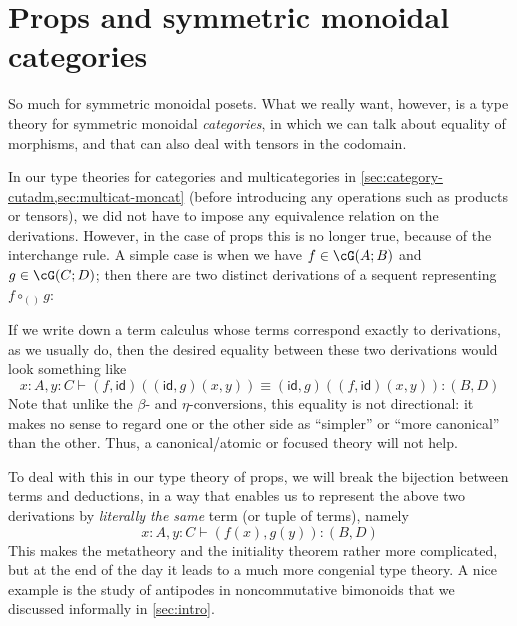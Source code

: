 \documentclass{book}
\def\idfunc{\mathsf{id}}
\let\types\vdash
\begin{document}
\section{Props and symmetric monoidal categories}
\label{sec:prop-smc}

So much for symmetric monoidal posets.
What we really want, however, is a type theory for symmetric monoidal \emph{categories}, in which we can talk about equality of morphisms, and that can also deal with tensors in the codomain.

In our type theories for categories and multicategories in \cref{sec:category-cutadm,sec:multicat-moncat} (before introducing any operations such as products or tensors), we did not have to impose any equivalence relation on the derivations.
However, in the case of props this is no longer true, because of the interchange rule.
A simple case is when we have $f\in \cG(A;B)$ and $g\in\cG(C;D)$; then there are two distinct derivations of a sequent representing $f\circ_{()} g$:
If we write down a term calculus whose terms correspond exactly to derivations, as we usually do, then the desired equality between these two derivations would look something like
\[ x:A, y:C \types (f,\idfunc)((\idfunc,g)(x,y)) \equiv (\idfunc,g)((f,\idfunc)(x,y)) : (B,D) \]
Note that unlike the $\beta$- and $\eta$-conversions, this equality is not directional: it makes no sense to regard one or the other side as ``simpler'' or ``more canonical'' than the other.
Thus, a canonical/atomic or focused theory will not help.

To deal with this in our type theory of props, we will break the bijection between terms and deductions, in a way that enables us to represent the above two derivations by \emph{literally the same} term (or tuple of terms), namely
\[ x:A, y:C \types (f(x),g(y)):(B,D) \]
This makes the metatheory and the initiality theorem rather more complicated, but at the end of the day it leads to a much more congenial type theory.
A nice example is the study of antipodes in noncommutative bimonoids that we discussed informally in \cref{sec:intro}.
\end{document}
